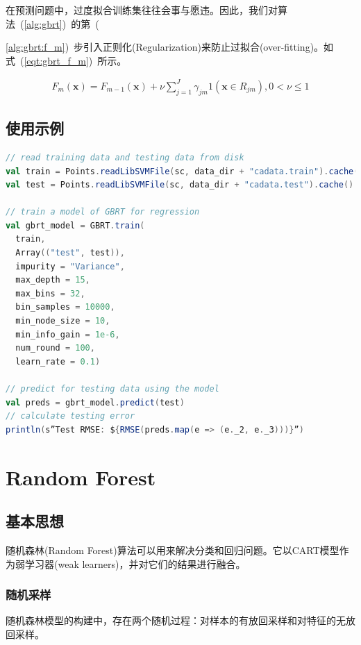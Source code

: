 \documentclass[a4paper,11pt,         %
               ]{article}
\begin{document}
在预测问题中，过度拟合训练集往往会事与愿违。因此，我们对算法~(\ref{alg:gbrt})~的第~({\ref{alg:gbrt:f_m})~步引入正则化(Regularization)来防止过拟合(over-fitting)。如式~(\ref{eqt:gbrt_f_m})~所示。

\begin{eqnarray}
  \label{eqt:gbrt_f_m}
F_{m}\left ( \mathbf{x} \right ) = F_{m-1}\left ( \mathbf{x} \right ) + \nu \sum _{j=1}^{J}{\gamma_{jm}1\left ( \mathbf{x} \in R_{jm}\right ) }, 0< \nu \leq 1
\end{eqnarray}

\subsection{使用示例}

\begin{lstlisting}[language={SCALA},title={RunGBRT.scala}]  
// read training data and testing data from disk
val train = Points.readLibSVMFile(sc, data_dir + "cadata.train").cache()
val test = Points.readLibSVMFile(sc, data_dir + "cadata.test").cache()

// train a model of GBRT for regression
val gbrt_model = GBRT.train(
  train,
  Array(("test", test)),
  impurity = "Variance",
  max_depth = 15,
  max_bins = 32,
  bin_samples = 10000,
  min_node_size = 10,
  min_info_gain = 1e-6,
  num_round = 100,
  learn_rate = 0.1)

// predict for testing data using the model
val preds = gbrt_model.predict(test)
// calculate testing error
println(s”Test RMSE: ${RMSE(preds.map(e => (e._2, e._3)))}”)
\end{lstlisting}  

\section{Random Forest}

\subsection{基本思想}

随机森林(Random Forest)算法可以用来解决分类和回归问题。它以CART模型作为弱学习器(weak learners)，并对它们的结果进行融合。

\subsubsection{随机采样}

随机森林模型的构建中，存在两个随机过程：对样本的有放回采样和对特征的无放回采样。

}
\end{document}
